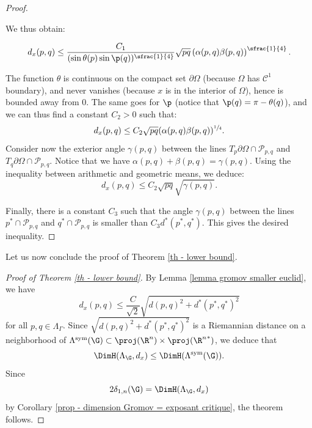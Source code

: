 \begin{proof}
\begin{figure}[htb]
\caption{}
\label{figure angles gromov distance}
\end{figure}

We thus obtain:

\[ d_x(p,q) \leq \frac{C_1}{(\sin \theta(p) \sin \p(q))^{\sfrac{1}{4}}} \sqrt{pq} \left( \alpha(p,q)\beta(p,q) \right)^{\sfrac{1}{4}}. \]

The function $\theta$ is continuous on the compact set $\partial \Omega$ (because $\Omega$ has $\mathcal C^1$ boundary), and never vanishes (because $x$ is in the interior of $\Omega$), hence is bounded away from $0$. The same goes for $\p$ (notice that $\p(q)=\pi-\theta(q)$), and we can thus find a constant $C_2>0$ such that:
\[ d_x(p,q)\leq C_2 \sqrt{pq} (\alpha(p,q)\beta(p,q))^{\sfrac{1}{4}}.\]
Consider now the exterior angle $\gamma(p,q)$ between the lines $T_p\partial\Omega \cap \mathcal P_{p,q}$ and $T_q\partial\Omega \cap \mathcal P_{p,q}$.
Notice that we have $\alpha(p,q)+\beta(p,q)=\gamma(p,q)$. Using the inequality between arithmetic and geometric means, we deduce:
\[ d_x(p,q)\leq C_2 \sqrt{pq} \sqrt{\gamma(p,q)}. \]

Finally, there is a constant $C_3$ such that the angle $\gamma(p,q)$ between the lines $p^*\cap \mathcal P_{p,q}$ and $q^* \cap \mathcal P_{p,q}$ is smaller than $C_3 d^*(p^*,q^*)$. This gives the desired inequality.
\end{proof}

Let us now conclude the proof of Theorem \ref{th - lower bound}.

\begin{proof}[Proof of Theorem \ref{th - lower bound}]
By Lemma \ref{lemma gromov smaller euclid}, we have
\[d_x(p,q) \leq \frac{C}{\sqrt{2}}\sqrt{d(p,q)^2 + d^*(p^*,q^*)^2}\]
for all $p,q \in \Lambda_\Gamma$. Since $\sqrt{d(p,q)^2 + d^*(p^*,q^*)^2}$ is a Riemannian distance on a neighborhood of $\Lambda^{\mathrm{sym}}(\G) \subset \proj(\R^n) \times \proj({\R^n}^*)$, we deduce that
\[\DimH(\Lambda_\G, d_x) \leq \DimH(\Lambda^{\mathrm{sym}}(\G)).\]
Since
\[2\delta_{1,n}(\G) = \DimH(\Lambda_\G, d_x)\]
by Corollary \ref{prop - dimension Gromov = exposant critique}, the theorem follows.
\end{proof}

